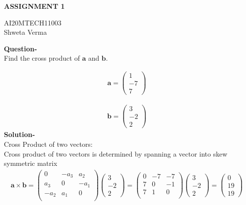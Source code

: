 \documentclass[11pt]{article}
\newcommand{\myvec}[1]{\ensuremath{\begin{pmatrix}#1\end{pmatrix}}}
\renewcommand{\vec}[1]{\boldsymbol{#1}}
\begin{document}
\begin{center}
\huge\textbf{ASSIGNMENT 1} 

\Large AI20MTECH11003
\\
\large Shweta Verma
\\

\end{center}
\large\textbf{Question-} 
\\
Find the cross product of $\boldsymbol{a}$ and $\boldsymbol{b}$.


\begin{align*}
\vec{a} = \myvec{1\\-7\\7}
\end{align*}


\begin{align*}
\vec{b} = \myvec{3\\-2\\2}
\end{align*}
\large\textbf{Solution-}
\\
Cross Product of two vectors: 
\\
Cross product of two vectors is determined by spanning a vector into skew symmetric matrix
\begin{align*}
\vec{a \times \vec{b}}
=\myvec
   {0 & -a_3 & a_2\\
   a_3 & 0 & -a_1\\
   -a_2 & a_1 & 0\\}
  \myvec{3\\-2\\2}
=\myvec
  {0 & -7 & -7\\
  7 & 0 & -1\\
  7 & 1 & 0\\}
 \myvec{3\\-2\\2}
=\myvec{0\\19\\19}
\end{align*}
\end{document}
